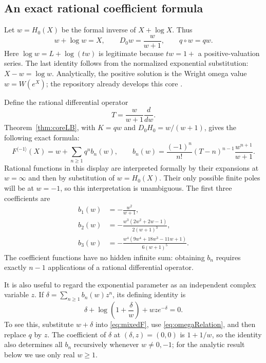 \documentclass[11pt,a4paper]{article}
\theoremstyle{definition}
\theoremstyle{remark}
\newcommand{\rev}{^{\langle-1\rangle}}
\begin{document}
\subsection{An exact rational coefficient formula}
Let $w=H_0(X)$ be the formal inverse of $X+\log X$. Thus
\begin{equation}\label{eq:omegaRelation}
 w+\log w=X,\qquad
 D_0w=\frac{w}{w+1},\qquad q\circ w=qw.
\end{equation}
Here $\log w=L+\log(tw)$ is legitimate because $tw=1+$ a positive-valuation
series. The last identity follows from the normalized exponential
substitution: $X-w=\log w$. Analytically, the positive solution is the
Wright omega value $w=W(e^X)$; the repository already develops this core
\cite{ProveIt,ProveItReadme}.

Define the rational differential operator
\[
 T=\frac{w}{w+1}\frac{d}{dw}.
\]
Theorem~\ref{thm:coreLB}, with $K=qw$ and $D_0H_0=w/(w+1)$, gives the
following exact formula:
\begin{equation}\label{eq:bnmixed}
 F\rev(X)=w+\sum_{n\ge1}q^n b_n(w),\qquad
 b_n(w)=\frac{(-1)^n}{n!}(T-n)^{n-1}
       \frac{w^{n+1}}{w+1}.
\end{equation}
Rational functions in this display are interpreted formally by their
expansions at $w=\infty$ and then by substitution of $w=H_0(X)$. Their only
possible finite poles will be at $w=-1$, so this interpretation is
unambiguous. The first three coefficients are
\begin{align}
 b_1(w)&=-\frac{w^2}{w+1},\label{eq:b1}\\
 b_2(w)&=-\frac{w^3(2w^2+2w-1)}{2(w+1)^3},\label{eq:b2}\\
 b_3(w)&=-\frac{w^4(9w^4+18w^3-11w+1)}{6(w+1)^5}.
 \label{eq:b3}
\end{align}
The coefficient functions have no hidden infinite sum: obtaining $b_n$
requires exactly $n-1$ applications of a rational differential operator.

It is also useful to regard the exponential parameter as an independent
complex variable $z$. If $\delta=\sum_{n\ge1}b_n(w)z^n$, its defining
identity is
\begin{equation}\label{eq:deltaImplicit}
 \delta+\log\left(1+\frac{\delta}{w}\right)
       +wz e^{-\delta}=0.
\end{equation}
To see this, substitute $w+\delta$ into \eqref{eq:mixedF}, use
\eqref{eq:omegaRelation}, and then replace $q$ by $z$. The coefficient of
$\delta$ at $(\delta,z)=(0,0)$ is $1+1/w$, so the identity also determines
all $b_n$ recursively whenever $w\ne0,-1$; for the analytic result below
we use only real $w\ge1$.
\end{document}

